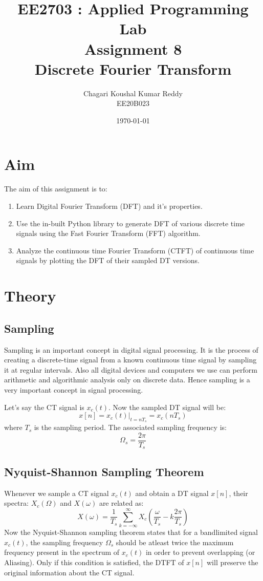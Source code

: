 \documentclass[12pt, a4paper]{article}
\title{\textbf{EE2703 : Applied Programming Lab \\ Assignment 8 \\ Discrete Fourier Transform}}
\author{Chagari Koushal Kumar Reddy \\ EE20B023} %
\date{\today} %
\begin{document}
		

\maketitle %
\clearpage

\tableofcontents
\clearpage

\section{Aim}
The aim of this assignment is to:
\begin{enumerate}
    \item Learn Digital Fourier Transform (DFT) and it's properties.
    \item Use the in-built Python library to generate DFT of various discrete time signals using the Fast Fourier Transform (FFT) algorithm.
    \item Analyze the continuous time Fourier Transform (CTFT) of continuous time signals by plotting the DFT of their sampled DT versions.
\end{enumerate}
\section{Theory}
\subsection{Sampling}
Sampling is an important concept in digital signal processing. It is the process of creating a discrete-time signal from a known continuous time signal by sampling it
at regular intervals. Also all digital devices and computers we use can perform arithmetic and algorithmic analysis only on discrete data. Hence sampling is a very important concept in signal processing.

Let's say the CT signal is $x_{c}(t)$. Now the sampled DT signal will be:
\begin{equation*}
    x[n] = x_{c}(t)|_{t=nT_{s}} = x_{c}(nT_{s})
\end{equation*}
where $T_{s}$ is the sampling period. The associated sampling frequency is:
\begin{equation*}
    \Omega_{s} = \frac{2\pi}{T_{s}}
\end{equation*}
\subsection{Nyquist-Shannon Sampling Theorem}
Whenever we sample a CT signal $x_{c}(t)$ and obtain a DT signal $x[n]$, their spectra: $X_{c}(\Omega)$ and $X(\omega)$ are related as:
\begin{equation*}
    X(\omega) = \frac{1}{T_{s}} \sum_{k=-\infty}^{\infty} X_{c}(\frac{\omega}{T_{s}}-k\frac{2\pi}{T_{s}})
\end{equation*}
Now the Nyquist-Shannon sampling theorem states that for a bandlimited signal $x_{c}(t)$, the sampling frequency $\Omega_{s}$ should be atleast twice the maximum frequency present in the spectrum of $x_{c}(t)$ in order to prevent overlapping (or Aliasing).
Only if this condition is satisfied, the DTFT of $x[n]$ will preserve the original information about the CT signal.
\end{document}
